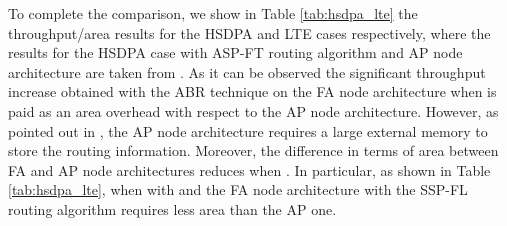 \documentclass[10pt,twocolumn,journal]{IEEEtran}
\begin{document}
To complete the comparison, we show in Table \ref{tab:hsdpa_lte} the throughput/area results for the HSDPA and LTE 
cases respectively, where the results for the HSDPA case with ASP-FT routing algorithm and AP node architecture 
are taken from \cite{martina_MPMS11}. As it can be observed the significant throughput increase obtained with the
ABR technique on the FA node architecture when  is paid as an area overhead with respect to the AP node architecture. 
However, as pointed out in \cite{martina_MPMS11}, the AP node architecture requires a large external memory to 
store the routing information. Moreover, the difference in terms of area between FA and AP node architectures reduces 
when . In particular, as shown in Table \ref{tab:hsdpa_lte}, when  with  and  the FA node 
architecture with the SSP-FL routing algorithm requires less area than the AP one.
\end{document}
